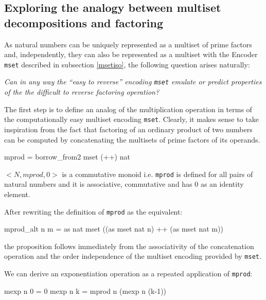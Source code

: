 \documentclass[]{INCLUDES/llncs}
\begin{document}
\subsection{Exploring the analogy between multiset decompositions and factoring}

As natural numbers can be uniquely represented as a multiset
of prime factors and, independently, they can also be represented as a multiset
with the Encoder {\tt mset} described in subsection \ref{msetiso}, the following
question arises naturally:

{\em Can in any way the ``easy to reverse'' encoding {\tt mset} emulate or
predict properties of the the difficult to reverse factoring operation?}

The first step is to define an analog of the multiplication operation in terms
of the computationally easy multiset encoding {\tt mset}. Clearly, it makes
sense to take inspiration from the fact that factoring of an ordinary product of 
two numbers can be computed by concatenating the multisets of 
prime factors of its operands.

\begin{code}
mprod = borrow_from2 mset (++) nat
\end{code}
\begin{prop}
$<N,mprod,0>$ is a commutative monoid i.e. {\tt mprod} is defined for all pairs of natural
numbers and it is associative, commutative
and has 0 as an identity element.
\end{prop}
After rewriting the definition of {\tt mprod} as the equivalent:
\begin{code}
mprod_alt n m = as nat mset ((as mset nat n) ++ (as mset nat m))
\end{code}
the proposition follows immediately from the associativity of the
concatenation operation and the order independence of the multiset
encoding provided by {\tt mset}.

We can derive an exponentiation operation as a repeated application of
{\tt mprod}:
\begin{code}
mexp n 0 = 0
mexp n k = mprod n (mexp n (k-1))
\end{code}
\end{document}
